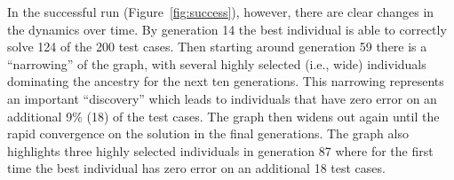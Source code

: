 In the successful run (Figure~\ref{fig:success}), however, there are clear changes in the dynamics over time. By generation 14 the best individual is able to correctly solve 124 of the 200 test cases. Then starting around generation 59 there is a ``narrowing'' of the graph, with several highly selected (i.e., wide) individuals dominating the ancestry for the next ten generations. This narrowing represents an important ``discovery'' which leads to individuals that have zero error on an additional 9\% (18) of the test cases. The graph then widens out again until the rapid convergence on the solution in the final generations. The graph also highlights three highly selected individuals in generation 87 where for the first time the best individual has zero error on an additional 18 test cases.
